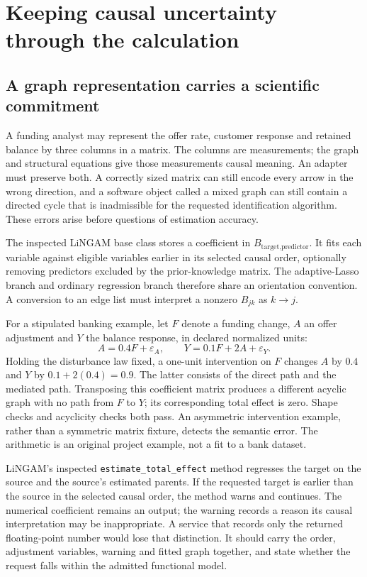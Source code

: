 \chapter{Keeping causal uncertainty through the calculation}
\label{v131:graph-uncertainty}

\section{A graph representation carries a scientific commitment}

A funding analyst may represent the offer rate, customer response and retained
balance by three columns in a matrix. The columns are measurements; the graph
and structural equations give those measurements causal meaning. An adapter
must preserve both. A correctly sized matrix can still encode every arrow in
the wrong direction, and a software object called a mixed graph can still
contain a directed cycle that is inadmissible for the requested identification
algorithm. These errors arise before questions of estimation accuracy.

The inspected LiNGAM base class stores a coefficient in
$B_{\text{target},\text{predictor}}$. It fits each variable against eligible
variables earlier in its selected causal order, optionally removing predictors
excluded by the prior-knowledge matrix. The adaptive-Lasso branch and ordinary
regression branch therefore share an orientation convention. A conversion to
an edge list must interpret a nonzero $B_{jk}$ as $k\to j$.
\citep{v131_sw_lingam}

For a stipulated banking example, let $F$ denote a funding change, $A$ an offer
adjustment and $Y$ the balance response, in declared normalized units:
\[
 A=0.4F+\varepsilon_A,\qquad
 Y=0.1F+2A+\varepsilon_Y.
\]
Holding the disturbance law fixed, a one-unit intervention on $F$ changes $A$
by $0.4$ and $Y$ by $0.1+2(0.4)=0.9$. The latter consists of the direct path
and the mediated path. Transposing this coefficient matrix produces a different
acyclic graph with no path from $F$ to $Y$; its corresponding total effect is
zero. Shape checks and acyclicity checks both pass. An asymmetric intervention
example, rather than a symmetric matrix fixture, detects the semantic error.
The arithmetic is an original project example, not a fit to a bank dataset.
\citep{v131_project_semantics}

LiNGAM's inspected \texttt{estimate\_total\_effect} method regresses the target
on the source and the source's estimated parents. If the requested target is
earlier than the source in the selected causal order, the method warns and
continues. The numerical coefficient remains an output; the warning records a
reason its causal interpretation may be inappropriate. A service that records
only the returned floating-point number would lose that distinction. It should
carry the order, adjustment variables, warning and fitted graph together, and
state whether the request falls within the admitted functional model.
\citep{v131_sw_lingam}

